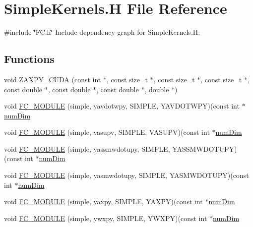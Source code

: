 \hypertarget{SimpleKernels_8H}{}\section{Simple\+Kernels.\+H File Reference}
\label{SimpleKernels_8H}
{\ttfamily \#include \char`\"{}F\+C.\+h\char`\"{}}\newline
Include dependency graph for Simple\+Kernels.\+H\+:
\subsection*{Functions}
\begin{DoxyCompactItemize}
\item 
void \hyperlink{SimpleKernels_8H_a798f0c52f246b61d9a4ee971fc735abc}{Z\+A\+X\+P\+Y\+\_\+\+C\+U\+DA} (const int $\ast$, const size\+\_\+t $\ast$, const size\+\_\+t $\ast$, const size\+\_\+t $\ast$, const double $\ast$, const double $\ast$, const double $\ast$, double $\ast$)
\item 
void \hyperlink{SimpleKernels_8H_a22078e2748198ace446a2e93e6c16ebe}{F\+C\+\_\+\+M\+O\+D\+U\+LE} (simple, yavdotwpy, S\+I\+M\+P\+LE, Y\+A\+V\+D\+O\+T\+W\+PY)(const int $\ast$\hyperlink{SATKernels_8H_a680185db8546de161968dabace9e94f1}{num\+Dim}
\item 
void \hyperlink{SimpleKernels_8H_a0da4fa20d11e1fa4432a8738e1a3d39e}{F\+C\+\_\+\+M\+O\+D\+U\+LE} (simple, vasupv, S\+I\+M\+P\+LE, V\+A\+S\+U\+PV)(const int $\ast$\hyperlink{SATKernels_8H_a680185db8546de161968dabace9e94f1}{num\+Dim}
\item 
void \hyperlink{SimpleKernels_8H_a6c029612cca2bec5b69f27245e3f30d9}{F\+C\+\_\+\+M\+O\+D\+U\+LE} (simple, yassmwdotupy, S\+I\+M\+P\+LE, Y\+A\+S\+S\+M\+W\+D\+O\+T\+U\+PY)(const int $\ast$\hyperlink{SATKernels_8H_a680185db8546de161968dabace9e94f1}{num\+Dim}
\item 
void \hyperlink{SimpleKernels_8H_aacf4db4952cbaa61fb2ecade671857e7}{F\+C\+\_\+\+M\+O\+D\+U\+LE} (simple, yasmwdotupy, S\+I\+M\+P\+LE, Y\+A\+S\+M\+W\+D\+O\+T\+U\+PY)(const int $\ast$\hyperlink{SATKernels_8H_a680185db8546de161968dabace9e94f1}{num\+Dim}
\item 
void \hyperlink{SimpleKernels_8H_a0ac54818168a982af500cfeb02414a43}{F\+C\+\_\+\+M\+O\+D\+U\+LE} (simple, yaxpy, S\+I\+M\+P\+LE, Y\+A\+X\+PY)(const int $\ast$\hyperlink{SATKernels_8H_a680185db8546de161968dabace9e94f1}{num\+Dim}
\item 
void \hyperlink{SimpleKernels_8H_ad0fc2fa835212355679fa7dc8bc561ae}{F\+C\+\_\+\+M\+O\+D\+U\+LE} (simple, ywxpy, S\+I\+M\+P\+LE, Y\+W\+X\+PY)(const int $\ast$\hyperlink{SATKernels_8H_a680185db8546de161968dabace9e94f1}{num\+Dim}

\end{DoxyCompactItemize}
